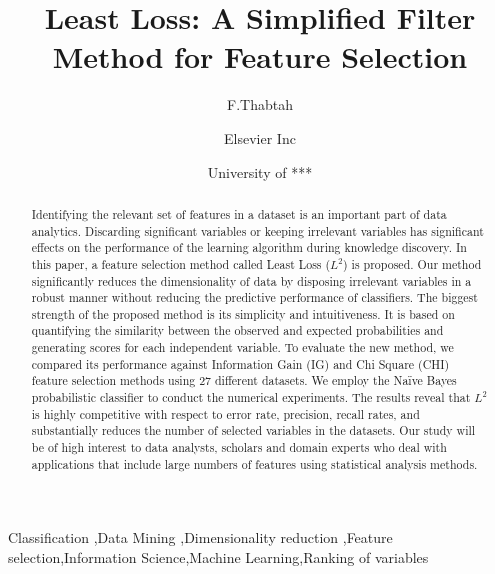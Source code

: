 \documentclass[review]{elsarticle}
\begin{document}
\begin{frontmatter}

\title{Least Loss: A Simplified Filter Method for Feature Selection}

\author{F.Thabtah}
\address{ address *** **, ****}


\author[mymainaddress,mysecondaryaddress]{Elsevier Inc}

\author[Fadi Thabtah]{ University of *** }


\begin{abstract}
Identifying the relevant set of features in a dataset is an important part of data analytics.  Discarding significant variables or keeping irrelevant variables has significant effects on the performance of the learning algorithm during knowledge discovery. In this paper, a feature selection method called Least Loss ($ L^2 $) is proposed. Our method significantly reduces the dimensionality of data by disposing irrelevant variables in a robust manner without reducing the predictive performance of classifiers. The biggest strength of the proposed method is its simplicity and intuitiveness. It is based on quantifying the similarity between the observed and expected probabilities and generating scores for each independent variable. To evaluate the new method, we compared its performance against Information Gain (IG) and Chi Square (CHI) feature selection methods using 27 different datasets. We employ the Naïve Bayes probabilistic classifier to conduct the numerical experiments. The results reveal that $ L^2 $ is highly competitive with respect to error rate, precision, recall rates, and substantially reduces the number of selected variables in the datasets. Our study will be of high interest to data analysts, scholars and domain experts who deal with applications that include large numbers of features using statistical analysis methods. 
\end{abstract}

\begin{keyword}
Classification \sep Data Mining \sep Dimensionality reduction \sep Feature selection\sep Information Science\sep Machine Learning\sep Ranking of variables

\end{keyword}

\end{frontmatter}
\end{document}
